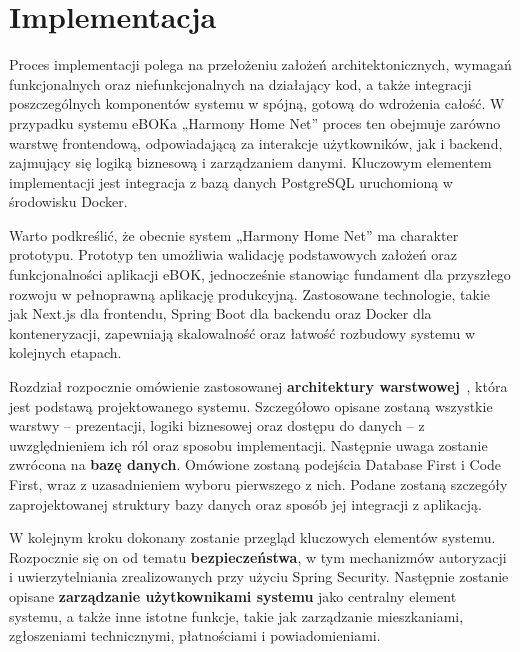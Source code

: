 \chapter{Implementacja}
Proces implementacji polega na przełożeniu założeń architektonicznych, wymagań funkcjonalnych oraz niefunkcjonalnych na działający kod, a także integracji poszczególnych komponentów systemu w spójną, gotową do wdrożenia całość. W przypadku systemu eBOKa „Harmony Home Net” proces ten obejmuje zarówno warstwę frontendową, odpowiadającą za interakcje użytkowników, jak i backend, zajmujący się logiką biznesową i zarządzaniem danymi. Kluczowym elementem implementacji jest integracja z bazą danych PostgreSQL uruchomioną w środowisku Docker.

Warto podkreślić, że obecnie system „Harmony Home Net” ma charakter prototypu. Prototyp ten umożliwia walidację podstawowych założeń oraz funkcjonalności aplikacji eBOK, jednocześnie stanowiąc fundament dla przyszłego rozwoju w pełnoprawną aplikację produkcyjną. Zastosowane technologie, takie jak Next.js dla frontendu, Spring Boot dla backendu oraz Docker dla konteneryzacji, zapewniają skalowalność oraz łatwość rozbudowy systemu w kolejnych etapach.

Rozdział rozpocznie omówienie zastosowanej \textbf{architektury warstwowej}~\cite{n_tier_wiki}, która jest podstawą projektowanego systemu. Szczegółowo opisane zostaną wszystkie warstwy – prezentacji, logiki biznesowej oraz dostępu do danych – z uwzględnieniem ich ról oraz sposobu implementacji. Następnie uwaga zostanie zwrócona na \textbf{bazę danych}. Omówione zostaną podejścia Database First i Code First, wraz z uzasadnieniem wyboru pierwszego z nich. Podane zostaną szczegóły zaprojektowanej struktury bazy danych oraz sposób jej integracji z aplikacją.

W kolejnym kroku dokonany zostanie przegląd kluczowych elementów systemu. Rozpocznie się on od tematu \textbf{bezpieczeństwa}, w tym mechanizmów autoryzacji i uwierzytelniania zrealizowanych przy użyciu Spring Security. Następnie zostanie opisane \textbf{zarządzanie użytkownikami systemu} jako centralny element systemu, a także inne istotne funkcje, takie jak zarządzanie mieszkaniami, zgłoszeniami technicznymi, płatnościami i powiadomieniami.




